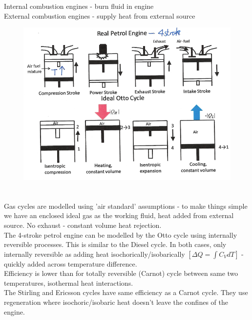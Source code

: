 \documentclass[a4paper, 11pt, normalem]{report}
\begin{document}
Internal combustion engines - burn fluid in engine \\
External combustion engines - supply heat from external source
\begin{figure}[H]
    \includegraphics[scale=0.5]{Petril.png}
\end{figure}

\chapter{}
Gas cycles are modelled using 'air standard' assumptions - to make things simple we have an enclosed ideal gas as the working fluid, heat added from external source.
No exhaust - constant volume heat rejection. \\
The 4-stroke petrol engine can be modelled by the Otto cycle using internally reversible processes.
This is similar to the Diesel cycle.
In both cases, only internally reversible as adding heat isochorically/isobarically $[\Delta Q = \int C_V dT]$ - quickly added across temperature difference. \\
Efficiency is lower than for totally reversible (Carnot) cycle between same two temperatures, isothermal heat interactions. \\
The Stirling and Ericsson cycles have same efficiency as a Carnot cycle.
They use regeneration where isochoric/isobaric heat doesn't leave the confines of the engine.
\end{document}
